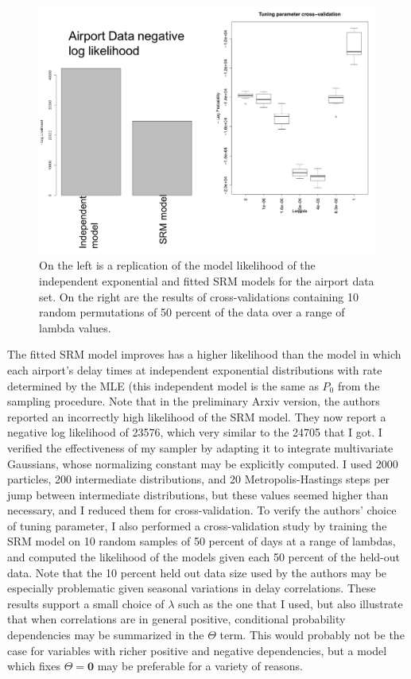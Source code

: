 \documentclass{samkoelleprelimworking}
\begin{document}
 \begin{figure}\label{fig:likelihoods}
\includegraphics[width=\textwidth]{likelihoods}
\caption{On the left is a replication of the model likelihood of the independent exponential and fitted SRM models for the airport data set.  On the right are the results of cross-validations containing 10 random permutations of 50 percent of the data over a range of lambda values.}
\end{figure}

The fitted SRM model improves has a higher likelihood than the model in which each airport's delay times at independent exponential distributions with rate determined by the MLE (this independent model is the same as $P_0$ from the sampling procedure.  Note that in the preliminary Arxiv version, the authors reported an incorrectly high likelihood of the SRM model.  They now report a negative log likelihood of 23576, which very similar to the 24705 that I got. I verified the effectiveness of my sampler by adapting it to integrate multivariate Gaussians, whose normalizing constant may be explicitly computed.  I used 2000 particles, 200 intermediate distributions, and 20 Metropolis-Hastings steps per jump between intermediate distributions, but these values seemed higher than necessary, and I reduced them for cross-validation.  To verify the authors' choice of tuning parameter, I also performed a cross-validation study by training the SRM model on 10 random samples of 50 percent of days at a range of lambdas, and computed the likelihood of the models given each 50 percent of the held-out data.  Note that the 10 percent held out data size used by the authors may be especially problematic given seasonal variations in delay correlations.  These results support a small choice of $\lambda$ such as the one that I used, but also illustrate that when correlations are in general positive, conditional probability dependencies may be summarized in the $\Theta$ term.   This would probably not be the case for variables with richer positive and negative dependencies, but a model which fixes $\Theta = \bm{0}$ may be preferable for a variety of reasons.
\end{document}
